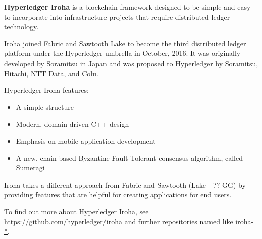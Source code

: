 \textbf{Hyperledger Iroha} is a blockchain framework designed to be simple and easy to incorporate into infrastructure projects that require distributed ledger technology. 

Iroha joined Fabric and Sawtooth Lake to become the third distributed ledger platform under the Hyperledger umbrella in October, 2016. It was originally developed by Soramitsu in Japan and was proposed to Hyperledger by Soramitsu, Hitachi, NTT Data, and Colu.

Hyperledger Iroha features:
\begin{itemize}
\item A simple structure
\item Modern, domain-driven C++ design
\item Emphasis on mobile application development
\item A new, chain-based Byzantine Fault Tolerant consensus algorithm, called Sumeragi 
\end{itemize}

Iroha takes a different approach from Fabric and Sawtooth (Lake---?? GG) by providing features that are helpful for creating applications for end users. 

To find out more about Hyperledger Iroha, see \url{https://github.com/hyperledger/iroha} and further repositories named like \url{iroha-*}.
